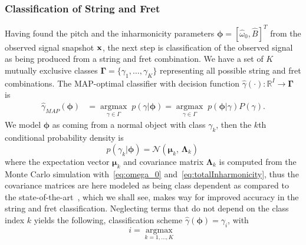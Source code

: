 \documentclass{article}
\begin{document}
\begin{sloppy}
\subsubsection{Classification of String and Fret}
Having found the pitch and the inharmonicity parameters $\boldsymbol{\phi} = [\widehat{\omega}_0, \widehat{B} ]^T$ from the observed signal snapshot $\mathbf x$, the next step is classification of the observed signal as being produced from a string and fret combination. 
We have a set of $K$ mutually exclusive classes $\boldsymbol{\Gamma}=\{\gamma_1,\dots,\gamma_K\}$ representing all possible string and fret combinations. The MAP-optimal classifier with decision function $\hat{\gamma}(\cdot): \mathbb{R}^I \rightarrow \boldsymbol{\Gamma}  $ is 
\begin{align}
    \hat\gamma_{{MAP}}(\boldsymbol{\phi}) &= \underset{\gamma\in\Gamma}{\operatorname{argmax}}\;{p(\gamma|\boldsymbol{\phi})} = \underset{\gamma\in\Gamma}{\operatorname{argmax}}\;{p(\boldsymbol{\phi}|\gamma)P(\gamma)}.
\end{align}
We model $\boldsymbol{\phi}$ as coming from a normal object with class $\gamma_k$, then the $k$th conditional probability density is   
\begin{equation}
    p(\gamma_k\lvert\boldsymbol{\phi}) =
    \mathcal{N}(\boldsymbol{\mu}_k,\,\boldsymbol{\Lambda}_k)\,
\end{equation}
where the expectation vector $\boldsymbol{\mu}_k$ and covariance matrix $\boldsymbol{ \Lambda }_k$ is computed from the Monte Carlo simulation with~\eqref{eq:omega_0} and~\eqref{eq:totalInharmonicity}, thus the covariance matrices are here modeled as being class dependent as compared to the state-of-the-art~\cite{hjerrild::icassp19}, which we shall see, makes way for improved accuracy in the string and fret classification. %
%
Neglecting terms that do not depend on the class index $k$ yields the following, classification scheme $\hat{\gamma}(\boldsymbol{\phi})={\gamma}_i$, with
%
\begin{equation}\label{eq:classifier}
  i=\underset{k=1,\dots,K}{\operatorname{argmax}}\;

\end{equation}
\end{sloppy}
\end{document}
